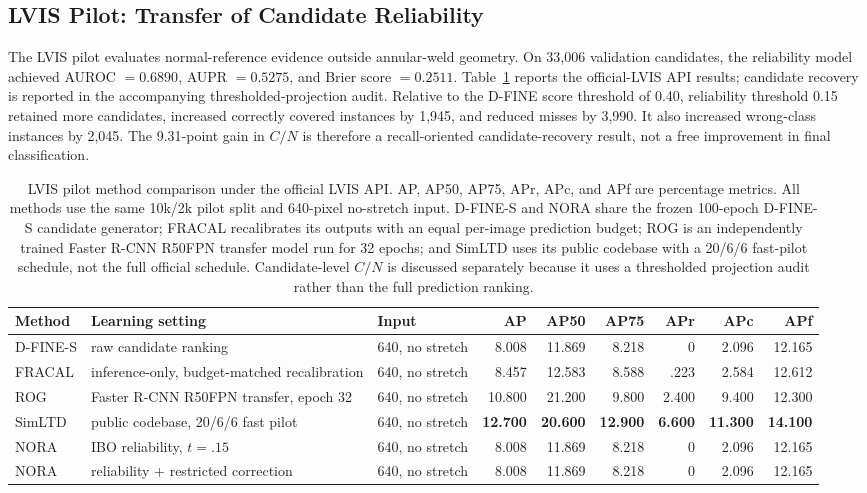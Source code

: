 \subsection{LVIS Pilot: Transfer of Candidate Reliability}
\label{sec:lvis-results}

The LVIS pilot evaluates normal-reference evidence outside annular-weld geometry. On 33,006 validation candidates, the reliability model achieved AUROC $=0.6890$, AUPR $=0.5275$, and Brier score $=0.2511$. Table~\ref{tab:lvispilot} reports the official-LVIS API results; candidate recovery is reported in the accompanying thresholded-projection audit. Relative to the D-FINE score threshold of 0.40, reliability threshold 0.15 retained more candidates, increased correctly covered instances by 1,945, and reduced misses by 3,990. It also increased wrong-class instances by 2,045. The 9.31-point gain in $C/N$ is therefore a recall-oriented candidate-recovery result, not a free improvement in final classification.

\begin{table}[!t]
\caption{LVIS pilot method comparison under the official LVIS API. AP, AP50, AP75, APr, APc, and APf are percentage metrics. All methods use the same 10k/2k pilot split and 640-pixel no-stretch input. D-FINE-S and NORA share the frozen 100-epoch D-FINE-S candidate generator; FRACAL recalibrates its outputs with an equal per-image prediction budget; ROG is an independently trained Faster R-CNN R50FPN transfer model run for 32 epochs; and SimLTD uses its public codebase with a 20/6/6 fast-pilot schedule, not the full official schedule. Candidate-level $C/N$ is discussed separately because it uses a thresholded projection audit rather than the full prediction ranking.}
\label{tab:lvispilot}
\centering
\scriptsize
\setlength{\tabcolsep}{3.2pt}
\begin{tabular}{lllrrrrrr}
\toprule
Method & Learning setting & Input & AP & AP50 & AP75 & APr & APc & APf \\
\midrule
D-FINE-S & raw candidate ranking & 640, no stretch & 8.008 & 11.869 & 8.218 & 0 & 2.096 & 12.165 \\
FRACAL & inference-only, budget-matched recalibration & 640, no stretch & 8.457 & 12.583 & 8.588 & .223 & 2.584 & 12.612 \\
ROG & Faster R-CNN R50FPN transfer, epoch 32 & 640, no stretch & 10.800 & 21.200 & 9.800 & 2.400 & 9.400 & 12.300 \\
SimLTD & public codebase, 20/6/6 fast pilot & 640, no stretch & \textbf{12.700} & \textbf{20.600} & \textbf{12.900} & \textbf{6.600} & \textbf{11.300} & \textbf{14.100} \\
NORA & IBO reliability, $t=.15$ & 640, no stretch & 8.008 & 11.869 & 8.218 & 0 & 2.096 & 12.165 \\
NORA & reliability + restricted correction & 640, no stretch & 8.008 & 11.869 & 8.218 & 0 & 2.096 & 12.165 \\
\bottomrule
\end{tabular}
\end{table}

